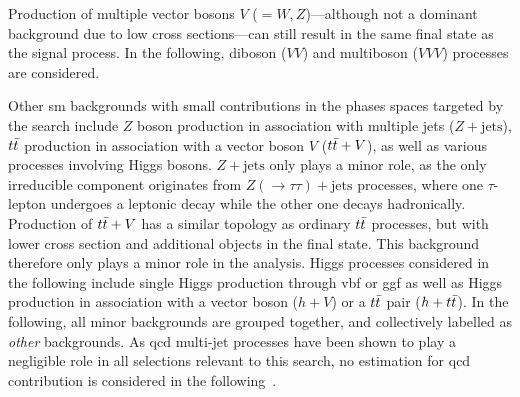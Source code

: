 Production of multiple vector bosons $V$ ($=W,Z$)---although not a dominant background due to low cross sections---can still result in the same final state as the signal process.
In the following, diboson ($VV$) and multiboson ($VVV$) processes are considered.

Other \gls{sm} backgrounds with small contributions in the phases spaces targeted by the search include $Z$ boson production in association with multiple jets ($Z+\mathrm{jets}$), $t\bar{t}$ production in association with a vector boson $V$ ($t\bar{t}+V$), as well as various processes involving Higgs bosons.
$Z+\mathrm{jets}$ only plays a minor role, as the only irreducible component originates from $Z(\rightarrow\tau\tau)+\mathrm{jets}$ processes, where one $\tau$-lepton undergoes a leptonic decay while the other one decays hadronically.
Production of $t\bar{t}+V$ has a similar topology as ordinary $t\bar{t}$ processes, but with lower cross section and additional objects in the final state. This background therefore only plays a minor role in the analysis.
Higgs processes considered in the following include single Higgs production through \gls{vbf} or \gls{ggf} as well as Higgs production in association with a vector boson ($h+V$) or a $t\bar{t}$ pair ($h+t\bar{t}$).
In the following, all minor backgrounds are grouped together, and collectively labelled as \textit{other} backgrounds. 
As \gls{qcd} multi-jet processes have been shown to play a negligible role in all selections relevant to this search, no estimation for \gls{qcd} contribution is considered in the following~\cite{SUSY-2019-08}.

